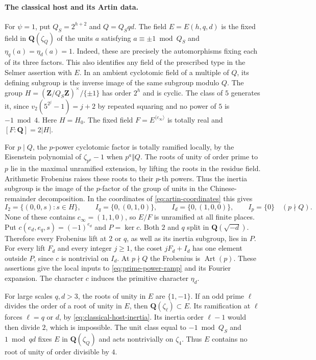 \paragraph{The classical host and its Artin data.}
For \(\psi=1\), put \(Q_S=2^{h+2}\) and \(Q=Q_Sqd\). The field
\(E=E(h,q,d)\) is the fixed field in \(\mathbf Q(\zeta_Q)\) of the
units \(a\) satisfying \(a\equiv\pm1\bmod Q_S\) and
\(\eta_q(a)=\eta_d(a)=1\). Indeed, these are precisely the
automorphisms fixing each of its three factors. This also identifies
any field of the prescribed type in the Selmer assertion with \(E\).
In an ambient cyclotomic field of a multiple of \(Q\), its defining
subgroup is the inverse image of the same subgroup modulo \(Q\).
The group \(H=(\mathbf Z/Q_S\mathbf Z)^\times/\{\pm1\}\) has order
\(2^h\) and is cyclic. The class of \(5\) generates it, since
\(v_2(5^{2^j}-1)=j+2\) by repeated squaring and no power of \(5\)
is \(-1\bmod 4\). Here \(H=H_0\). The fixed field \(F=E^{\langle
c_\infty\rangle}\) is totally real and \([F:\mathbf Q]=2|H|\).

For \(p\mid Q\), the \(p\)-power cyclotomic factor is totally ramified
locally, by the Eisenstein polynomial of \(\zeta_{p^a}-1\) when
\(p^a\Vert Q\). The roots of unity of order prime to \(p\) lie in the
maximal unramified extension, by lifting the roots in the residue
field. Arithmetic Frobenius raises these roots to their \(p\)-th
powers. Thus the inertia subgroup is the image of the \(p\)-factor
of the group of units in the Chinese-remainder decomposition. In
the coordinates of \eqref{eq:artin-coordinates} this gives
\begin{equation}
\label{eq:classical-host-inertia}
 I_2=\{(0,0,s):s\in H\},\qquad
 I_q=\{0,(0,1,0)\},\qquad I_d=\{0,(1,0,0)\},
 \qquad I_p=\{0\}\quad(p\nmid Q).
\end{equation}
None of these contains \(c_\infty=(1,1,0)\), so \(E/F\) is
unramified at all finite places. Put \(c(e_d,e_q,s)=(-1)^{e_d}\)
and \(P=\ker c\). Both \(2\) and \(q\) split in
\(\mathbf Q(\sqrt{-d})\). Therefore every Frobenius lift at \(2\)
or \(q\), as well as its inertia subgroup, lies in \(P\).
For every lift \(F_d\) and every integer \(j\ge1\), the coset
\(jF_d+I_d\) has one element outside \(P\), since \(c\) is
nontrivial on \(I_d\). At \(p\nmid Q\) the Frobenius is
\(\operatorname{Art}(p)\). These assertions give the local inputs
to \eqref{eq:prime-power-ramp} and its Fourier expansion. The character
\(c\) induces the primitive character \(\eta_d\).

%
For large scales \(q,d>3\), the roots of unity in \(E\) are
\(\{1,-1\}\). If an odd prime \(\ell\) divides the order of a
root of unity in \(E\), then \(\mathbf Q(\zeta_\ell)\subset E\).
Its ramification at \(\ell\) forces \(\ell=q\) or \(d\), by
\eqref{eq:classical-host-inertia}. Its inertia order \(\ell-1\)
would then divide \(2\), which is impossible. The unit class equal
to \(-1\bmod Q_S\) and \(1\bmod qd\) fixes \(E\) in
\(\mathbf Q(\zeta_Q)\) and acts nontrivially on \(\zeta_4\).
Thus \(E\) contains no root of unity of order divisible by \(4\).

